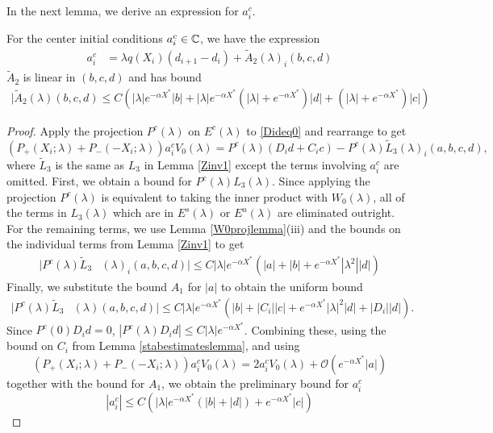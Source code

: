 \documentclass[thesis.tex]{subfiles}
\begin{document}
In the next lemma, we derive an expression for $a_i^c$.

\begin{lemma}\label{lemma:ac1}
For the center initial conditions $a_i^c \in \mathbb{C}$, we have the expression
\begin{align}\label{tildeciexp1}
a_i^c &= \lambda q(X_i) (d_{i+1} - d_i ) + \tilde{A}_2(\lambda)_i(b, c, d)
\end{align}
$\tilde{A}_2$ is linear in $(b, c, d)$ and has bound
\begin{align}\label{tildeA2bound}
|\tilde{A}_2(\lambda)(b, c, d) \leq C \left( |\lambda| e^{-\alpha X^*} |b| + |\lambda| e^{-\alpha X^*} (|\lambda| + e^{-\alpha X^*}) |d| + (|\lambda| + e^{-\alpha X^*})|c| \right)
\end{align}

\begin{proof}
Apply the projection $P^c(\lambda)$ on $E^c(
\lambda)$ to \eqref{Dideq0} and rearrange to get  
\begin{equation}\label{PcDid}
(P_+(X_i; \lambda) + P_-(-X_i; \lambda))a_i^c V_0(\lambda) = 
P^c(\lambda)(D_i d + C_i c) - P^c(\lambda) \tilde{L}_3(\lambda)_i(a,b,c,d),
\end{equation}
where $\tilde{L}_3$ is the same as $L_3$ in Lemma \ref{Zinv1} except the terms involving $a_i^c$ are omitted. First, we obtain a bound for $P^c(\lambda)L_3(\lambda)$. Since applying the projection $P^c(\lambda)$ is equivalent to taking the inner product with $W_0(\lambda)$, all of the terms in $L_3(\lambda)$ which are in $E^s(\lambda)$ or $E^u(\lambda)$ are eliminated outright. For the remaining terms, we use Lemma \ref{W0projlemma}(iii) and the bounds on the individual terms from Lemma \ref{Zinv1} to get
\begin{align*}
|P^c(\lambda)\tilde{L}_3&(\lambda)_i(a,b,c,d)| \leq C |\lambda| e^{-\alpha X^*}  \left( |a| + |b| + e^{-\alpha X^*} |\lambda^2| |d| \right)
\end{align*}
Finally, we substitute the bound $A_1$ for $|a|$ to obtain the uniform bound  
\begin{align}\label{PcL3bound}
|P^c(\lambda)\tilde{L}_3&(\lambda)(a,b,c,d)| \leq C |\lambda| e^{-\alpha X^*}  \left( |b| + |C_i||c| + e^{-\alpha X^*} |\lambda|^2 |d| + |D_i||d| \right).
\end{align}
Since $P^c(0)D_i d = 0$, $|P^c(\lambda)D_i d| \leq C |\lambda|e^{-\alpha X^*}$. Combining these, using the bound on $C_i$ from Lemma \ref{stabestimateslemma}, and using
\[
(P_+(X_i; \lambda) + P_-(-X_i; \lambda))a_i^c V_0(\lambda) = 2 a_i^c V_0(\lambda) + \mathcal{O}(e^{-\alpha X^*}|a|)
\]
together with the bound for $A_1$, we obtain the preliminary bound for $a_i^c$
\begin{equation}\label{tildecbound1}
|a_i^c| \leq C \left( |\lambda| e^{-\alpha X^*}  \left( |b| + |d| \right) + e^{-\alpha X^*} |c| \right)
\end{equation}


\end{proof}
\end{lemma}
\end{document}
